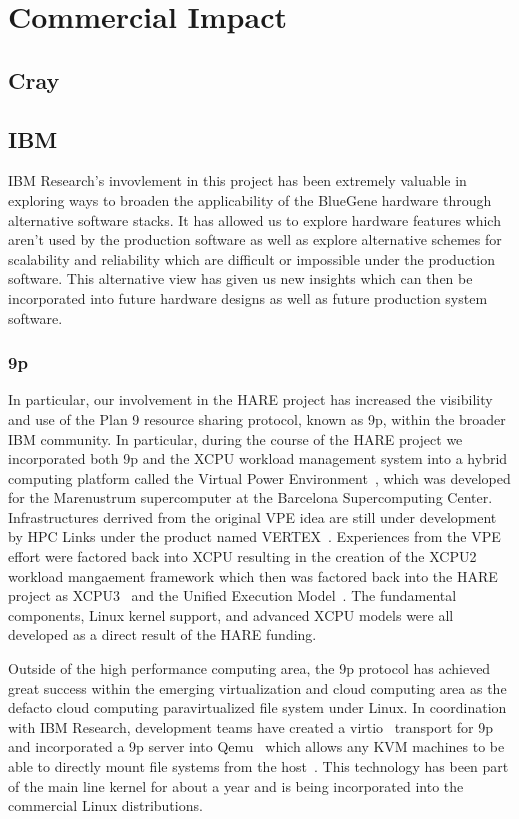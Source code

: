 \chapter{Commercial Impact}
\section{Cray}
\section{IBM}
IBM Research's invovlement in this project has been extremely valuable in exploring
ways to broaden the applicability of the BlueGene hardware through alternative software
stacks.  It has allowed us to explore hardware features which aren't used by the production
software as well as explore alternative schemes for scalability and reliability which are
difficult or impossible under the production software.  This alternative view has given us
new insights which can then be incorporated into future hardware designs as well as future
production system software.

\subsection{9p}

In particular, our involvement in the HARE project has increased the visibility and use
of the Plan 9 resource sharing protocol, known as 9p, within the broader IBM community.
In particular, during the course of the HARE project we incorporated both 9p and the XCPU
workload management system into a hybrid computing platform called the Virtual Power
Environment~\cite{VPE}, which was developed for the Marenustrum supercomputer at the Barcelona 
Supercomputing Center.  Infrastructures derrived from the original VPE idea are still
under development by HPC Links under the product named VERTEX~\cite{vertex}.
Experiences from the VPE effort were factored back into XCPU
resulting in the creation of the XCPU2~\cite{xcpu2} workload mangaement framework which then was
factored back into the HARE project as XCPU3~\cite{xcpu3} and the 
Unified Execution Model~\cite{uem}.  The fundamental components, Linux kernel support, and
advanced XCPU models were all developed as a direct result of the HARE funding.

Outside of the high performance computing area, the 9p protocol has achieved great success
within the emerging virtualization and cloud computing area as the defacto cloud computing
paravirtualized file system under Linux.  In coordination with IBM Research, development
teams have created a virtio~\cite{virtio} transport for 9p and incorporated a 9p server into
Qemu~\cite{qemu} which allows any KVM machines to be able to directly mount file systems
from the host~\cite{virtfs}.  This technology has been part of the main line kernel for about
a year and is being incorporated into the commercial Linux distributions.

